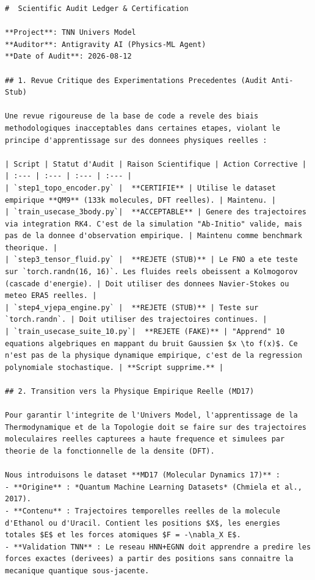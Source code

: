\documentclass[11pt,a4paper]{article}
\begin{document}
\begin{lstlisting}[language={}, caption={}, basicstyle=\ttfamily\footnotesize, breaklines=true]
#  Scientific Audit Ledger & Certification

**Project**: TNN Univers Model
**Auditor**: Antigravity AI (Physics-ML Agent)
**Date of Audit**: 2026-08-12

## 1. Revue Critique des Experimentations Precedentes (Audit Anti-Stub)

Une revue rigoureuse de la base de code a revele des biais methodologiques inacceptables dans certaines etapes, violant le principe d'apprentissage sur des donnees physiques reelles :

| Script | Statut d'Audit | Raison Scientifique | Action Corrective |
| :--- | :--- | :--- | :--- |
| `step1_topo_encoder.py` |  **CERTIFIE** | Utilise le dataset empirique **QM9** (133k molecules, DFT reelles). | Maintenu. |
| `train_usecase_3body.py`|  **ACCEPTABLE** | Genere des trajectoires via integration RK4. C'est de la simulation "Ab-Initio" valide, mais pas de la donnee d'observation empirique. | Maintenu comme benchmark theorique. |
| `step3_tensor_fluid.py` |  **REJETE (STUB)** | Le FNO a ete teste sur `torch.randn(16, 16)`. Les fluides reels obeissent a Kolmogorov (cascade d'energie). | Doit utiliser des donnees Navier-Stokes ou meteo ERA5 reelles. |
| `step4_vjepa_engine.py` |  **REJETE (STUB)** | Teste sur `torch.randn`. | Doit utiliser des trajectoires continues. |
| `train_usecase_suite_10.py`|  **REJETE (FAKE)** | "Apprend" 10 equations algebriques en mappant du bruit Gaussien $x \to f(x)$. Ce n'est pas de la physique dynamique empirique, c'est de la regression polynomiale stochastique. | **Script supprime.** |

## 2. Transition vers la Physique Empirique Reelle (MD17)

Pour garantir l'integrite de l'Univers Model, l'apprentissage de la Thermodynamique et de la Topologie doit se faire sur des trajectoires moleculaires reelles capturees a haute frequence et simulees par theorie de la fonctionnelle de la densite (DFT).

Nous introduisons le dataset **MD17 (Molecular Dynamics 17)** :
- **Origine** : *Quantum Machine Learning Datasets* (Chmiela et al., 2017).
- **Contenu** : Trajectoires temporelles reelles de la molecule d'Ethanol ou d'Uracil. Contient les positions $X$, les energies totales $E$ et les forces atomiques $F = -\nabla_X E$.
- **Validation TNN** : Le reseau HNN+EGNN doit apprendre a predire les forces exactes (derivees) a partir des positions sans connaitre la mecanique quantique sous-jacente.


\end{lstlisting}
\end{document}
